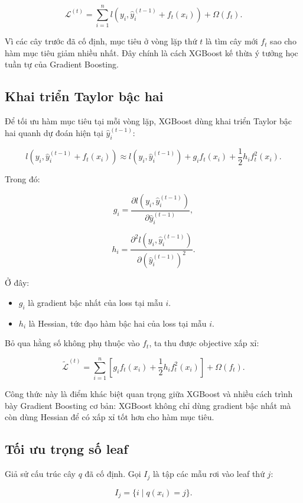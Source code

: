 \[
\mathcal{L}^{(t)}
=
\sum_{i=1}^{n}
l\left(y_i, \hat{y}_i^{(t-1)} + f_t(x_i)\right)
+
\Omega(f_t).
\]

Vì các cây trước đã cố định, mục tiêu ở vòng lặp thứ $t$ là tìm cây mới $f_t$ sao cho hàm mục tiêu giảm nhiều nhất. Đây chính là cách XGBoost kế thừa ý tưởng học tuần tự của Gradient Boosting.

\subsection{Khai triển Taylor bậc hai}

Để tối ưu hàm mục tiêu tại mỗi vòng lặp, XGBoost dùng khai triển Taylor bậc hai quanh dự đoán hiện tại $\hat{y}_i^{(t-1)}$:

\[
l\left(y_i, \hat{y}_i^{(t-1)} + f_t(x_i)\right)
\approx
l\left(y_i, \hat{y}_i^{(t-1)}\right)
+
g_i f_t(x_i)
+
\frac{1}{2} h_i f_t^2(x_i).
\]

Trong đó:

\[
g_i =
\frac{\partial l(y_i, \hat{y}_i^{(t-1)})}
{\partial \hat{y}_i^{(t-1)}},
\]

\[
h_i =
\frac{\partial^2 l(y_i, \hat{y}_i^{(t-1)})}
{\partial (\hat{y}_i^{(t-1)})^2}.
\]

Ở đây:

\begin{itemize}
    \item $g_i$ là gradient bậc nhất của loss tại mẫu $i$.
    \item $h_i$ là Hessian, tức đạo hàm bậc hai của loss tại mẫu $i$.
\end{itemize}

Bỏ qua hằng số không phụ thuộc vào $f_t$, ta thu được objective xấp xỉ:

\[
\tilde{\mathcal{L}}^{(t)}
=
\sum_{i=1}^{n}
\left[
g_i f_t(x_i)
+
\frac{1}{2}h_i f_t^2(x_i)
\right]
+
\Omega(f_t).
\]

Công thức này là điểm khác biệt quan trọng giữa XGBoost và nhiều cách trình bày Gradient Boosting cơ bản: XGBoost không chỉ dùng gradient bậc nhất mà còn dùng Hessian để có xấp xỉ tốt hơn cho hàm mục tiêu.

\subsection{Tối ưu trọng số leaf}

Giả sử cấu trúc cây $q$ đã cố định. Gọi $I_j$ là tập các mẫu rơi vào leaf thứ $j$:

\[
I_j = \{i \mid q(x_i) = j\}.
\]

